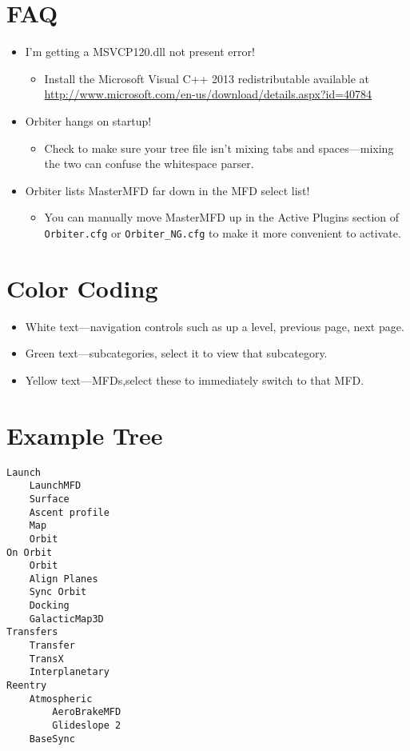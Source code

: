 \documentclass[12pt]{article}
\begin{document}
\section{FAQ}
\begin{itemize}
\item I'm getting a MSVCP120.dll not present error!
\begin{itemize} \item Install the Microsoft Visual C++ 2013 redistributable available at \url{http://www.microsoft.com/en-us/download/details.aspx?id=40784}\end{itemize}
\item Orbiter hangs on startup!
\begin{itemize} \item Check to make sure your tree file isn't mixing tabs and spaces---mixing the two can confuse the whitespace parser.\end{itemize}
\item Orbiter lists MasterMFD far down in the MFD select list!
\begin{itemize} \item You can manually move MasterMFD up in the Active Plugins section of \texttt{Orbiter.cfg} or \texttt{Orbiter\_NG.cfg} to make it more convenient to activate.\end{itemize}
\end{itemize}

\section{Color Coding}
\begin{itemize}
\item     White text---navigation controls such as up a level, previous page, next page.
\item    Green text---subcategories, select it to view that subcategory.
\item    Yellow text---MFDs,select these to immediately switch to that MFD.
\end{itemize}

\newpage

\section{Example Tree}
\begin{lstlisting}[frame=single]
Launch
	LaunchMFD
	Surface
	Ascent profile
	Map
	Orbit
On Orbit
	Orbit
	Align Planes
	Sync Orbit
	Docking
	GalacticMap3D
Transfers
	Transfer
	TransX
	Interplanetary
Reentry
	Atmospheric
		AeroBrakeMFD
		Glideslope 2
	BaseSync
\end{lstlisting}
\end{document}
